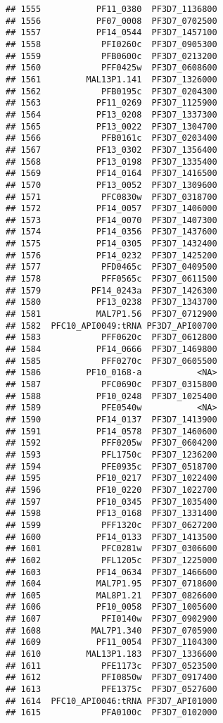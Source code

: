 \documentclass[12pt, a4paper]{article}\usepackage[]{graphicx}\usepackage[]{color}
\makeatletter
\newenvironment{kframe}{%
 \def\at@end@of@kframe{}%
 \ifinner\ifhmode%
  \def\at@end@of@kframe{\end{minipage}}%
  \begin{minipage}{\columnwidth}%
 \fi\fi%
 \def\FrameCommand##1{\hskip\@totalleftmargin \hskip-\fboxsep
 \colorbox{shadecolor}{##1}\hskip-\fboxsep
     \hskip-\linewidth \hskip-\@totalleftmargin \hskip\columnwidth}%
 \MakeFramed {\advance\hsize-\width
   \@totalleftmargin\z@ \linewidth\hsize
   \@setminipage}}%
 {\par\unskip\endMakeFramed%
 \at@end@of@kframe}
\newenvironment{knitrout}{}{} %
\makeatother
\begin{document}
\begin{knitrout}
\begin{kframe}
\begin{verbatim}
## 1555           PF11_0380  PF3D7_1136800
## 1556           PF07_0008  PF3D7_0702500
## 1557           PF14_0544  PF3D7_1457100
## 1558            PFI0260c  PF3D7_0905300
## 1559            PFB0600c  PF3D7_0213200
## 1560            PFF0425w  PF3D7_0608600
## 1561         MAL13P1.141  PF3D7_1326000
## 1562            PFB0195c  PF3D7_0204300
## 1563           PF11_0269  PF3D7_1125900
## 1564           PF13_0208  PF3D7_1337300
## 1565           PF13_0022  PF3D7_1304700
## 1566            PFB0161c  PF3D7_0203400
## 1567           PF13_0302  PF3D7_1356400
## 1568           PF13_0198  PF3D7_1335400
## 1569           PF14_0164  PF3D7_1416500
## 1570           PF13_0052  PF3D7_1309600
## 1571            PFC0830w  PF3D7_0318700
## 1572           PF14_0057  PF3D7_1406000
## 1573           PF14_0070  PF3D7_1407300
## 1574           PF14_0356  PF3D7_1437600
## 1575           PF14_0305  PF3D7_1432400
## 1576           PF14_0232  PF3D7_1425200
## 1577            PFD0465c  PF3D7_0409500
## 1578            PFF0565c  PF3D7_0611500
## 1579          PF14_0243a  PF3D7_1426300
## 1580           PF13_0238  PF3D7_1343700
## 1581           MAL7P1.56  PF3D7_0712900
## 1582  PFC10_API0049:tRNA PF3D7_API00700
## 1583            PFF0620c  PF3D7_0612800
## 1584           PF14_0666  PF3D7_1469800
## 1585            PFF0270c  PF3D7_0605500
## 1586         PF10_0168-a           <NA>
## 1587            PFC0690c  PF3D7_0315800
## 1588           PF10_0248  PF3D7_1025400
## 1589            PFE0540w           <NA>
## 1590           PF14_0137  PF3D7_1413900
## 1591           PF14_0578  PF3D7_1460600
## 1592            PFF0205w  PF3D7_0604200
## 1593            PFL1750c  PF3D7_1236200
## 1594            PFE0935c  PF3D7_0518700
## 1595           PF10_0217  PF3D7_1022400
## 1596           PF10_0220  PF3D7_1022700
## 1597           PF10_0345  PF3D7_1035400
## 1598           PF13_0168  PF3D7_1331400
## 1599            PFF1320c  PF3D7_0627200
## 1600           PF14_0133  PF3D7_1413500
## 1601            PFC0281w  PF3D7_0306600
## 1602            PFL1205c  PF3D7_1225000
## 1603           PF14_0634  PF3D7_1466600
## 1604           MAL7P1.95  PF3D7_0718600
## 1605           MAL8P1.21  PF3D7_0826600
## 1606           PF10_0058  PF3D7_1005600
## 1607            PFI0140w  PF3D7_0902900
## 1608          MAL7P1.340  PF3D7_0705900
## 1609           PF11_0054  PF3D7_1104300
## 1610         MAL13P1.183  PF3D7_1336600
## 1611            PFE1173c  PF3D7_0523500
## 1612            PFI0850w  PF3D7_0917400
## 1613            PFE1375c  PF3D7_0527600
## 1614  PFC10_API0046:tRNA PF3D7_API01000
## 1615            PFA0100c  PF3D7_0102000

\end{verbatim}
\end{kframe}
\end{knitrout}
\end{document}
